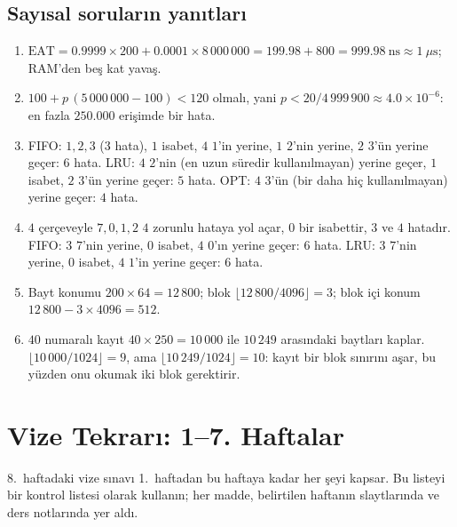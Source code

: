 \documentclass[11pt,a4paper]{article}
\begin{document}
\subsection*{Sayısal soruların yanıtları}
\begin{enumerate}[leftmargin=1.6em,start=11]
  \item $\text{EAT} = 0.9999 \times 200 + 0.0001 \times 8\,000\,000 = 199.98 + 800 = 999.98\ \text{ns} \approx 1\ \mu\text{s}$; RAM'den beş kat yavaş.
  \item $100 + p\,(5\,000\,000 - 100) < 120$ olmalı, yani $p < 20/4\,999\,900 \approx 4.0\times10^{-6}$: en fazla $250.000$ erişimde bir hata.
  \item FIFO: $1,2,3$ (3 hata), $1$ isabet, $4$ $1$'in yerine, $1$ $2$'nin yerine, $2$ $3$'ün yerine geçer: $6$ hata. LRU: $4$ $2$'nin (en uzun süredir kullanılmayan) yerine geçer, $1$ isabet, $2$ $3$'ün yerine geçer: $5$ hata. OPT: $4$ $3$'ün (bir daha hiç kullanılmayan) yerine geçer: $4$ hata.
  \item $4$ çerçeveyle $7,0,1,2$ $4$ zorunlu hataya yol açar, $0$ bir isabettir, $3$ ve $4$ hatadır. FIFO: $3$ $7$'nin yerine, $0$ isabet, $4$ $0$'ın yerine geçer: $6$ hata. LRU: $3$ $7$'nin yerine, $0$ isabet, $4$ $1$'in yerine geçer: $6$ hata.
  \item Bayt konumu $200 \times 64 = 12\,800$; blok $\lfloor 12\,800/4096 \rfloor = 3$; blok içi konum $12\,800 - 3\times 4096 = 512$.
  \item $40$ numaralı kayıt $40 \times 250 = 10\,000$ ile $10\,249$ arasındaki baytları kaplar. $\lfloor 10\,000/1024 \rfloor = 9$, ama $\lfloor 10\,249/1024 \rfloor = 10$: kayıt bir blok sınırını aşar, bu yüzden onu okumak iki blok gerektirir.
\end{enumerate}

\section{Vize Tekrarı: 1--7. Haftalar}

8.\ haftadaki vize sınavı 1.\ haftadan bu haftaya kadar her şeyi kapsar. Bu listeyi bir kontrol listesi olarak kullanın; her madde, belirtilen haftanın slaytlarında ve ders notlarında yer aldı.
\end{document}
